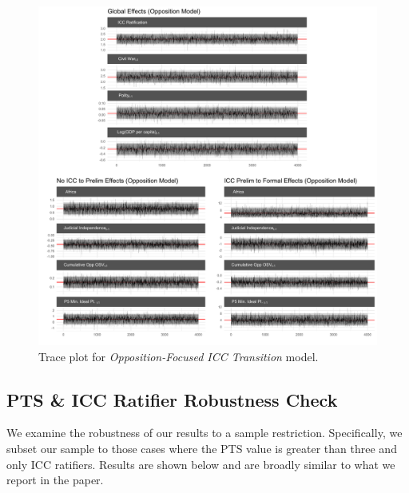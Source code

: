 \begin{figure}
    \centering
    \includegraphics[width=1\textwidth]{rebelCoefTrace.pdf}
    \caption{Trace plot for \emph{Opposition-Focused ICC Transition} model.}
    \label{fig:oppTrace}
\end{figure}
\FloatBarrier

\subsection*{PTS \& ICC Ratifier Robustness Check}


We examine the robustness of our results to a sample restriction. Specifically, we subset our sample to those cases where the PTS value is greater than three and only ICC ratifiers. Results are shown below and are broadly similar to what we report in the paper.

